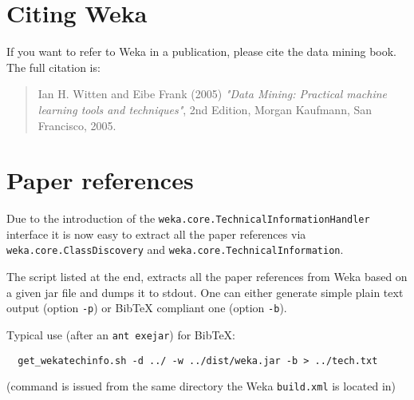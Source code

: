 
\section{Citing Weka}
If you want to refer to Weka in a publication, please cite the data mining book. The full citation is:

\begin{quote}
Ian H. Witten and Eibe Frank (2005) \textit{"Data Mining: Practical machine learning tools and techniques"}, 2nd Edition, Morgan Kaufmann, San Francisco, 2005.                                                                                          \end{quote}

\section{Paper references}
Due to the introduction of the \texttt{weka.core.TechnicalInformationHandler} interface it is now easy to extract all the paper references via \texttt{weka.core.ClassDiscovery} and \texttt{weka.core.TechnicalInformation}.

The script listed at the end, extracts all the paper references from Weka based on a given jar file and dumps it to stdout. One can either generate simple plain text output (option \texttt{-p}) or BibTeX compliant one (option \texttt{-b}).

Typical use (after an \texttt{ant exejar}) for BibTeX:

\begin{verbatim}
  get_wekatechinfo.sh -d ../ -w ../dist/weka.jar -b > ../tech.txt
\end{verbatim}

\noindent (command is issued from the same directory the Weka \texttt{build.xml} is located in)

